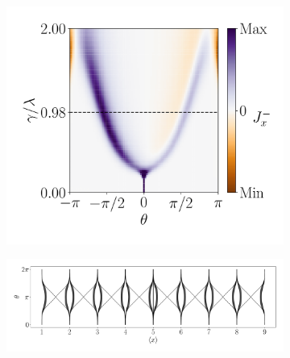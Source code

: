 \begin{figure}[h!]
\begin{minipage}[h!]{1\textwidth}
\begin{subfigure}[b!]{0.35 \textwidth}
         \end{subfigure}\hspace*{-0.5em}
         \begin{subfigure}[b!]{0.35 \textwidth}
             \caption{}
             \includegraphics[width=\textwidth]{Imagenes/Resultados_pump_Cuadrado/xy/current_square_pump_neg.pdf}
         \end{subfigure}\hspace*{-0.5em}
     \end{minipage}\vspace*{-1em}
     
     
     \begin{minipage}[h!]{1\textwidth}
         \begin{subfigure}[b!]{0.9 \textwidth}
             \caption{}
             \includegraphics[width=\textwidth]{Imagenes/Resultados_pump_Cuadrado/xy/wannier_centerx.pdf}
         \end{subfigure}\hspace*{-0.5em}
     \end{minipage}\vspace*{-1em}


\end{figure}

